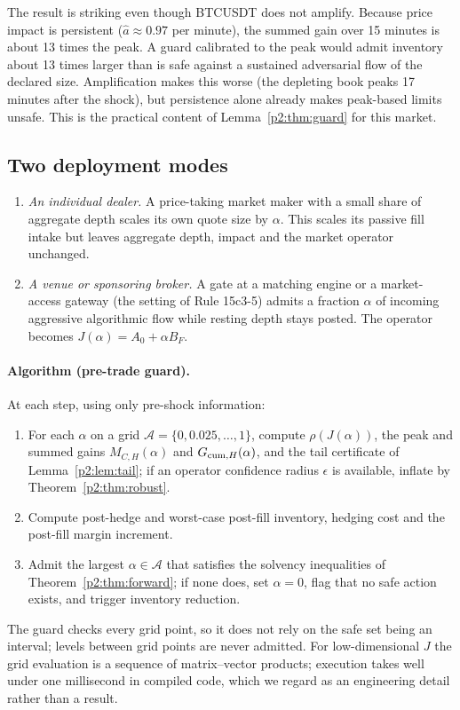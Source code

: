 The result is striking even though BTCUSDT does not amplify. Because price impact is persistent ($\hat a\approx0.97$ per minute), the summed gain over 15 minutes is about 13 times the peak. A guard calibrated to the peak would admit inventory about 13 times larger than is safe against a sustained adversarial flow of the declared size. Amplification makes this worse (the depleting book peaks 17 minutes after the shock), but persistence alone already makes peak-based limits unsafe. This is the practical content of Lemma~\ref{p2:thm:guard} for this market.

\subsection{Two deployment modes}

\begin{enumerate}[label=\textbf{Mode \Alph*.},leftmargin=*]
\item \emph{An individual dealer.} A price-taking market maker with a small share of aggregate depth scales its own quote size by $\alpha$. This scales its passive fill intake but leaves aggregate depth, impact and the market operator unchanged.
\item \emph{A venue or sponsoring broker.} A gate at a matching engine or a market-access gateway (the setting of Rule 15c3-5) admits a fraction $\alpha$ of incoming aggressive algorithmic flow while resting depth stays posted. The operator becomes $J(\alpha)=A_0+\alpha B_F$.
\end{enumerate}

\paragraph{Algorithm (pre-trade guard).} At each step, using only pre-shock information:
\begin{enumerate}[itemsep=1pt]
\item For each $\alpha$ on a grid $\mathcal A=\{0,0.025,\ldots,1\}$, compute $\rho(J(\alpha))$, the peak and summed gains $M_{C,H}(\alpha)$ and $G_{{\rm cum},H}(\alpha)$, and the tail certificate of Lemma~\ref{p2:lem:tail}; if an operator confidence radius $\epsilon$ is available, inflate by Theorem~\ref{p2:thm:robust}.
\item Compute post-hedge and worst-case post-fill inventory, hedging cost and the post-fill margin increment.
\item Admit the largest $\alpha\in\mathcal A$ that satisfies the solvency inequalities of Theorem~\ref{p2:thm:forward}; if none does, set $\alpha=0$, flag that no safe action exists, and trigger inventory reduction.
\end{enumerate}
The guard checks every grid point, so it does not rely on the safe set being an interval; levels between grid points are never admitted. For low-dimensional $J$ the grid evaluation is a sequence of matrix--vector products; execution takes well under one millisecond in compiled code, which we regard as an engineering detail rather than a result.

